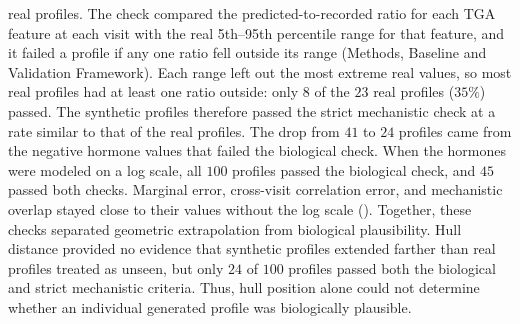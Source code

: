 {{real profiles. The check compared the predicted-to-recorded ratio for each TGA feature at each
visit with the real 5th--95th percentile range for that feature, and it failed a profile if any
one ratio fell outside its range (Methods, Baseline and Validation Framework). Each range left
out the most extreme real values, so most real profiles had at least one ratio outside: only
$8$ of the $23$ real profiles ($35\%$) passed. The synthetic profiles therefore
passed the strict mechanistic check at a rate similar to that of the real profiles. The drop
from $41$ to $24$ profiles came from the negative hormone values that failed the biological
check. When the hormones were modeled on a log scale, all $100$ profiles
passed the biological check, and $45$ passed both checks. Marginal error, cross-visit
correlation error, and mechanistic overlap stayed close to their values without the log scale
().} Together, these checks
separated geometric extrapolation from biological plausibility. Hull distance provided no
evidence that synthetic profiles extended farther than real profiles treated as unseen, but
only $24$ of $100$ profiles passed both the biological and strict mechanistic criteria. Thus,
hull position alone could not determine whether an individual generated profile was
biologically plausible.}

\subsection{}

